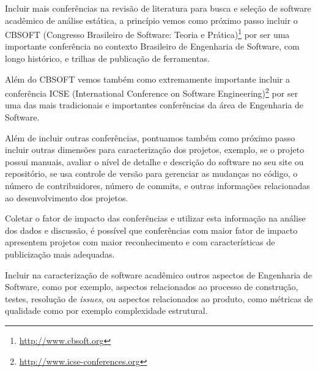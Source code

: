 Incluir mais conferências na revisão de literatura para busca e seleção de
software acadêmico de análise estática, a princípio vemos como próximo passo
incluir o CBSOFT (Congresso Brasileiro de Software: Teoria e
Prática)\footnote{\url{http://www.cbsoft.org}} por ser uma importante
conferência no contexto Brasileiro de Engenharia de Software, com longo
histórico, e trilhas de publicação de ferramentas.

Além do CBSOFT vemos também como extremamente importante incluir a conferência
ICSE (International Conference on Software
Engineering)\footnote{\url{http://www.icse-conferences.org}} por ser uma das
mais tradicionais e importantes conferências da área de Engenharia de Software.


Além de incluir outras conferências, pontuamos também como próximo passo
incluir outras dimensões para caracterização dos projetos, exemplo, se o
projeto possui manuais, avaliar o nível de detalhe e descrição do software no
seu site ou repositório, se usa controle de versão para gerenciar as mudanças
no código, o número de contribuidores, número de commits, e outras informações
relacionadas ao desenvolvimento dos projetos.

Coletar o fator de impacto das conferências e utilizar esta informação na
análise dos dados e discussão, é possível que conferências com maior fator de
impacto apresentem projetos com maior reconhecimento e com características de
publicização mais adequadas.

Incluir na caracterização de software acadêmico outros aspectos de Engenharia
de Software, como por exemplo, aspectos relacionados ao processo de construção,
testes, resolução de {\it issues}, ou aspectos relacionados ao produto, como
métricas de qualidade como por exemplo complexidade estrutural.


